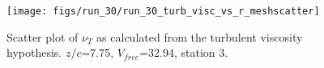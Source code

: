 \begin{figure}[H]
\centering
\texttt{[image: figs/run\_30/run\_30\_turb\_visc\_vs\_r\_meshscatter]}
\caption{Scatter plot of $\nu_T$ as calculated from the turbulent viscosity hypothesis. $z/c$=7.75, $V_{free}$=32.94, station 3.}
\label{fig:run_30_turb_visc_vs_r_meshscatter}
\end{figure}


